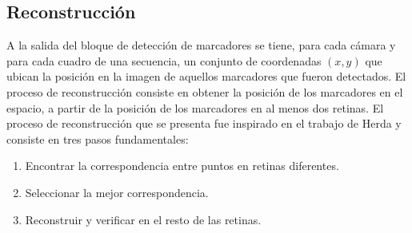 \subsection{Reconstrucción}
A la salida del bloque de detección de marcadores se tiene, para cada cámara y para cada cuadro de una secuencia, un conjunto de coordenadas $(x,y)$ que ubican la posición en la imagen de aquellos marcadores que fueron detectados.
El proceso de reconstrucción consiste en obtener la posición de los marcadores en el espacio, a partir de la posición de los marcadores en al menos dos retinas.
%
%
El proceso de reconstrucción que se presenta fue inspirado en el trabajo de Herda \cite{herda} y consiste en tres pasos fundamentales:
\begin{enumerate}
\item Encontrar la correspondencia entre puntos en retinas diferentes.
\item Seleccionar la mejor correspondencia.
\item Reconstruir y verificar en el resto de las retinas.
\end{enumerate}
%
